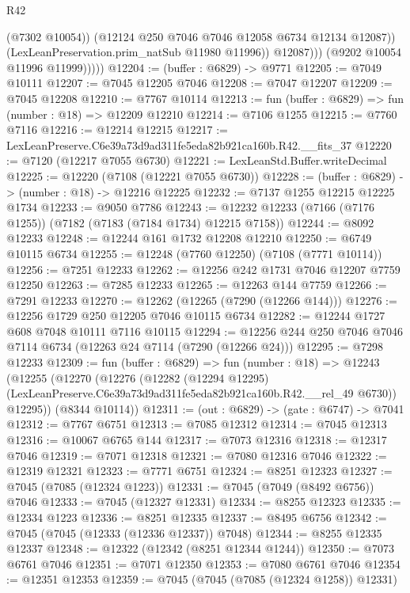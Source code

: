\begin{lexlean}{R42}
\begin{coremodule}
{                        (@7302 @10054))
                      (@12124 @250 @7046 @7046 @12058 @6734 @12134 @12087))
                    (LexLeanPreservation.prim_natSub @11980 @11996))
                  @12087)))
            (@9202 @10054 @11996 @11999)))))
@12204 := (buffer : @6829) -> @9771
@12205 := @7049 @10111
@12207 := @7045 @12205 @7046
@12208 := @7047 @12207
@12209 := @7045 @12208
@12210 := @7767 @10114
@12213 := fun (buffer : @6829) => fun (number : @18) => @12209 @12210
@12214 := @7106 @1255
@12215 := @7760 @7116
@12216 := @12214 @12215
@12217 := LexLeanPreserve.C6e39a73d9ad311fe5eda82b921ca160b.R42.__fits_37
@12220 := @7120 (@12217 @7055 @6730)
@12221 := LexLeanStd.Buffer.writeDecimal
@12225 := @12220 (@7108 (@12221 @7055 @6730))
@12228 := (buffer : @6829) -> (number : @18) -> @12216 @12225
@12232 := @7137 @1255 @12215 @12225 @1734
@12233 := @9050 @7786
@12243 := @12232 @12233 (@7166 (@7176 @1255)) (@7182 (@7183 (@7184 @1734) @12215 @7158))
@12244 := @8092 @12233
@12248 := @12244 @161 @1732 @12208 @12210
@12250 := @6749 @10115 @6734
@12255 := @12248 (@7760 @12250) (@7108 (@7771 @10114))
@12256 := @7251 @12233
@12262 := @12256 @242 @1731 @7046 @12207 @7759 @12250
@12263 := @7285 @12233
@12265 := @12263 @144 @7759
@12266 := @7291 @12233
@12270 := @12262 (@12265 (@7290 (@12266 @144)))
@12276 := @12256 @1729 @250 @12205 @7046 @10115 @6734
@12282 := @12244 @1727 @608 @7048 @10111 @7116 @10115
@12294 := @12256 @244 @250 @7046 @7046 @7114 @6734 (@12263 @24 @7114 (@7290 (@12266 @24)))
@12295 := @7298 @12233
@12309 := fun (buffer : @6829) =>
  fun (number : @18) =>
  @12243
    (@12255
      (@12270
        (@12276
          (@12282
            (@12294 @12295)
            (LexLeanPreserve.C6e39a73d9ad311fe5eda82b921ca160b.R42.__rel_49 @6730))
          @12295))
      (@8344 @10114))
@12311 := (out : @6829) -> (gate : @6747) -> @7041
@12312 := @7767 @6751
@12313 := @7085 @12312
@12314 := @7045 @12313
@12316 := @10067 @6765 @144
@12317 := @7073 @12316
@12318 := @12317 @7046
@12319 := @7071 @12318
@12321 := @7080 @12316 @7046
@12322 := @12319 @12321
@12323 := @7771 @6751
@12324 := @8251 @12323
@12327 := @7045 (@7085 (@12324 @1223))
@12331 := @7045 (@7049 (@8492 @6756)) @7046
@12333 := @7045 (@12327 @12331)
@12334 := @8255 @12323
@12335 := @12334 @1223
@12336 := @8251 @12335
@12337 := @8495 @6756
@12342 := @7045 (@7045 (@12333 (@12336 @12337)) @7048)
@12344 := @8255 @12335 @12337
@12348 := @12322 (@12342 (@8251 @12344 @1244))
@12350 := @7073 @6761 @7046
@12351 := @7071 @12350
@12353 := @7080 @6761 @7046
@12354 := @12351 @12353
@12359 := @7045 (@7045 (@7085 (@12324 @1258)) @12331)
}
\end{coremodule}
\end{lexlean}
